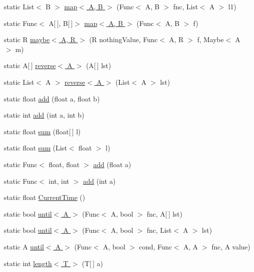 \begin{DoxyCompactItemize}
\item 
static List$<$ B $>$ \hyperlink{class_prelude_af88b11f6efd832167c447ff0853b4dc5}{map$<$ A, B $>$} (Func$<$ A, B $>$ fnc, List$<$ A $>$ l1)
\item 
static Func$<$ A\mbox{[}$\,$\mbox{]}, B\mbox{[}$\,$\mbox{]}$>$ \hyperlink{class_prelude_a8b3a2033fb646a5e4119877b8e6ccfa6}{map$<$ A, B $>$} (Func$<$ A, B $>$ f)
\item 
static R \hyperlink{class_prelude_a5da0f7da87097d2d71be9791e5ee003d}{maybe$<$ A, R $>$} (R nothing\+Value, Func$<$ A, R $>$ f, Maybe$<$ A $>$ m)
\item 
static A\mbox{[}$\,$\mbox{]} \hyperlink{class_prelude_a591bd4c1b7d2bf2637d29dd5d405afc5}{reverse$<$ A $>$} (A\mbox{[}$\,$\mbox{]} lst)
\item 
static List$<$ A $>$ \hyperlink{class_prelude_a29e216f5f859c33e8af4b51296549efa}{reverse$<$ A $>$} (List$<$ A $>$ lst)
\item 
static float \hyperlink{class_prelude_ac38041bbca6fb624b26693fe1f1f2662}{add} (float a, float b)
\item 
static int \hyperlink{class_prelude_a24898ad2e9ec3bf98b10f51d06b2c39b}{add} (int a, int b)
\item 
static float \hyperlink{class_prelude_a049dabbc41086c050167ec9f98219805}{sum} (float\mbox{[}$\,$\mbox{]} l)
\item 
static float \hyperlink{class_prelude_ae5e5f0ff388970467c1d754e05e9bff6}{sum} (List$<$ float $>$ l)
\item 
static Func$<$ float, float $>$ \hyperlink{class_prelude_a66f5498e75b1388532903897f0221746}{add} (float a)
\item 
static Func$<$ int, int $>$ \hyperlink{class_prelude_a1d4edfa224e4f6eeea49b7ae79a786d4}{add} (int a)
\item 
static float \hyperlink{class_prelude_a57a58b618048cce95b499c7fda9579d9}{Current\+Time} ()
\item 
static bool \hyperlink{class_prelude_a8355ba69f174ac4d0d1ad6ccbc0dfacf}{until$<$ A $>$} (Func$<$ A, bool $>$ fnc, A\mbox{[}$\,$\mbox{]} lst)
\item 
static bool \hyperlink{class_prelude_a9b501bee5a991914dad3984c1847a28b}{until$<$ A $>$} (Func$<$ A, bool $>$ fnc, List$<$ A $>$ lst)
\item 
static A \hyperlink{class_prelude_ae0a02afb54556ca9d08460b07f3c7b94}{until$<$ A $>$} (Func$<$ A, bool $>$ cond, Func$<$ A, A $>$ fnc, A value)
\item 
static int \hyperlink{class_prelude_a62e274f4f5e738a62ce8857a8a4340cb}{length$<$ T $>$} (T\mbox{[}$\,$\mbox{]} a)

\end{DoxyCompactItemize}
